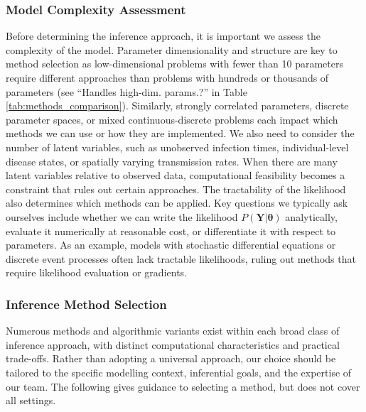 \documentclass{article}
\begin{document}
\subsubsection{Model Complexity Assessment}

Before determining the inference approach, it is important we assess the complexity of the model.
Parameter dimensionality and structure are key to method selection as low-dimensional problems with fewer than 10 parameters require different approaches than problems with hundreds or thousands of parameters (see ``Handles high-dim. params.?'' in Table \ref{tab:methods_comparison}).
Similarly, strongly correlated parameters, discrete parameter spaces, or mixed continuous-discrete problems each impact which methods we can use or how they are implemented.
We also need to consider the number of latent variables, such as unobserved infection times, individual-level disease states, or spatially varying transmission rates.
When there are many latent variables relative to observed data, computational feasibility becomes a constraint that rules out certain approaches.
The tractability of the likelihood also determines which methods can be applied.
Key questions we typically ask ourselves include whether we can write the likelihood $P(\boldsymbol{Y}|\boldsymbol{\theta})$ analytically, evaluate it numerically at reasonable cost, or differentiate it with respect to parameters.
As an example, models with stochastic differential equations or discrete event processes often lack tractable likelihoods, ruling out methods that require likelihood evaluation or gradients.

\subsubsection{Inference Method Selection}

Numerous methods and algorithmic variants exist within each broad class of inference approach, with distinct computational characteristics and practical trade-offs.
Rather than adopting a universal approach, our choice should be tailored to the specific modelling context, inferential goals, and the expertise of our team.
The following gives guidance to selecting a method, but does not cover all settings.
\end{document}
